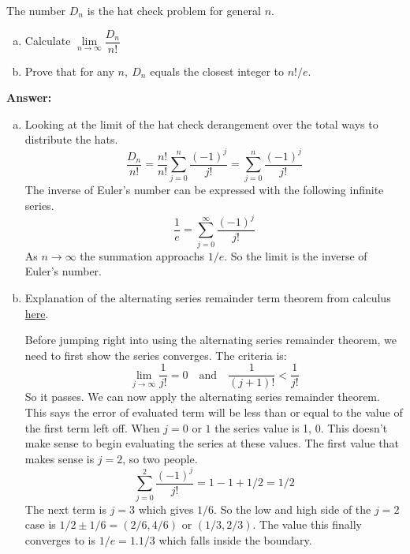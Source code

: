 \documentclass{article}
\begin{document}
\begin{problem} %
The number $D_n$ is the hat check problem for general $n$.
\begin{enumerate}[(a)]
    \item Calculate $\lim\limits_{n \rightarrow \infty} \dfrac{D_n}{n!}$
    \item Prove that for any $n, \: D_n$ equals the closest integer to $n!/e$.
\end{enumerate}
\end{problem}

\textbf{Answer:}

\begin{enumerate}[(a)]
    \item Looking at the limit of the hat check derangement over the total ways to distribute the hats.
    \begin{equation*}
        \dfrac{D_n}{n!} = \dfrac{n!}{n!} \sum_{j=0}^{n}\dfrac{(-1)^{j}}{j!} = \sum_{j=0}^{n}\dfrac{(-1)^{j}}{j!}
    \end{equation*}
    The inverse of Euler's number can be expressed with the following infinite series.
    \begin{equation*}
        \dfrac{1}{e} = \sum_{j=0}^{\infty}\dfrac{(-1)^{j}}{j!}
    \end{equation*}
    As $n \rightarrow \infty$ the summation approachs $1/e$. So the limit is the inverse of Euler's number.
    \item Explanation of the alternating series remainder term theorem from calculus \href{https://content.dodea.edu/VS/HS/AP_Calculus/websites/AP_Calculus_M9/section9_5c/docs/Lesson%2009.05c.06%20The%20Alternating%20Series%20Remainder%20Theorem.pdf}{here}.
    
    \medskip
    Before jumping right into using the alternating series remainder theorem, we need to first show the series converges. The criteria is:
    \begin{equation*}
        \lim_{j \rightarrow \infty}\dfrac{1}{j!} = 0 \quad \text{and} \quad \dfrac{1}{(j+1)!} < \dfrac{1}{j!}
    \end{equation*}
    So it passes. We can now apply the alternating series remainder theorem. This says the error of evaluated term will be less than or equal to the value of the first term left off. When $j=0 \text{ or } 1$ the series value is 1, 0. This doesn't make sense to begin evaluating the series at these values. The first value that makes sense is $j=2$, so two people.
    \begin{equation*}
        \sum_{j=0}^{2}\dfrac{(-1)^{j}}{j!} = 1 - 1 + 1/2 = 1/2
    \end{equation*}
    The next term is $j=3$ which gives $1/6$. So the low and high side of the $j=2$ case is $1/2 \pm 1/6 = (2/6, 4/6)$ or $(1/3, 2/3)$. The value this finally converges to is $1/e = 1.1/3$ which falls inside the boundary.


\end{enumerate}
\end{document}
